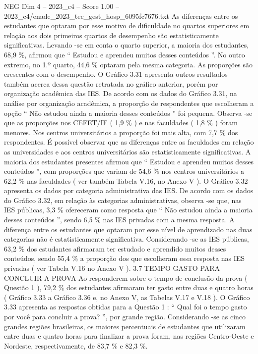 \begin{textsample}{NEG Dim 4 – 2023\_c4 – Score 1.00 – 2023\_c4/enade\_2023\_tec\_gest\_hosp\_6095fc7676.txt}
As diferenças entre os estudantes que optaram por esse motivo de dificuldade no quartos superiores em relação aos dois primeiros quartos de desempenho são estatisticamente significativas.
Levando -se em conta o quarto superior, a maioria dos estudantes, 68,9 \%, afirmou que “ Estudou e aprendeu muitos desses conteúdos ”.
No outro extremo, no 1.º quarto, 44,6 \% optaram pela mesma categoria.
As proporções são crescentes com o desempenho.
O Gráfico 3.31 apresenta outros resultados também acerca dessa questão retratada no gráfico anterior, porém por organização acadêmica das IES.
De acordo com os dados do Gráfico 3.31, na análise por organização acadêmica, a proporção de respondentes que escolheram a opção “ Não estudou ainda a maioria desses conteúdos ” foi pequena.
Observa -se que as proporções nos CEFET/IF ( 1,9 \% ) e nas faculdades ( 1,8 \% ) foram menores.
Nos centros universitários a proporção foi mais alta, com 7,7 \% dos respondentes.
É possível observar que as diferenças entre as faculdades em relação as universidades e aos centros universitários são estatisticamente significativas.
A maioria dos estudantes presentes afirmou que “ Estudou e aprendeu muitos desses conteúdos ”, com proporções que variam de 54,6 \% nos centros universitários a 62,2 \% nas faculdades ( ver também Tabela V.16, no Anexo V ).
O Gráfico 3.32 apresenta os dados por categoria administrativa das IES.
De acordo com os dados do Gráfico 3.32, em relação às categorias administrativas, observa -se que, nas IES públicas, 3,3 \% ofereceram como resposta que “ Não estudou ainda a maioria desses conteúdos ”, sendo 6,5 \% nas IES privadas com a mesma resposta.
A diferença entre os estudantes que optaram por esse nível de aprendizado nas duas categorias não é estatisticamente significativa.
Considerando -se as IES públicas, 63,2 \% dos estudantes afirmaram ter estudado e aprendido muitos desses conteúdos, sendo 55,4 \% a proporção dos que escolheram essa resposta nas IES privadas ( ver Tabela V.16 no Anexo V ). 3.7 TEMPO GASTO PARA CONCLUIR A PROVA Ao responderem sobre o tempo de conclusão da prova ( Questão 1 ), 79,2 \% dos estudantes afirmaram ter gasto entre duas e quatro horas ( Gráfico 3.33 a Gráfico 3.36 e, no Anexo V, as Tabelas V.17 e V.18 ).
O Gráfico 3.33 apresenta as respostas obtidas para a Questão 1 : “ Qual foi o tempo gasto por você para concluir a prova? ”, por grande região.
Considerando -se as cinco grandes regiões brasileiras, os maiores percentuais de estudantes que utilizaram entre duas e quatro horas para finalizar a prova foram, nas regiões Centro-Oeste e Nordeste, respectivamente, de 83,7 \% e 82,3 \%.

\end{textsample}
